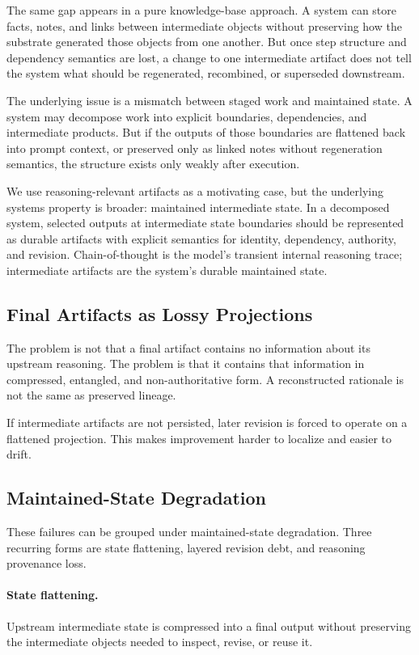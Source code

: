\documentclass{article}
\begin{document}
The same gap appears in a pure knowledge-base approach. A system can store facts, notes, and links between intermediate objects without preserving how the substrate generated those objects from one another. But once step structure and dependency semantics are lost, a change to one intermediate artifact does not tell the system what should be regenerated, recombined, or superseded downstream.

The underlying issue is a mismatch between staged work and maintained state. A system may decompose work into explicit boundaries, dependencies, and intermediate products. But if the outputs of those boundaries are flattened back into prompt context, or preserved only as linked notes without regeneration semantics, the structure exists only weakly after execution.

We use reasoning-relevant artifacts as a motivating case, but the underlying systems property is broader: maintained intermediate state. In a decomposed system, selected outputs at intermediate state boundaries should be represented as durable artifacts with explicit semantics for identity, dependency, authority, and revision. Chain-of-thought is the model's transient internal reasoning trace; intermediate artifacts are the system's durable maintained state.

\subsection{Final Artifacts as Lossy Projections}

The problem is not that a final artifact contains no information about its upstream reasoning. The problem is that it contains that information in compressed, entangled, and non-authoritative form. A reconstructed rationale is not the same as preserved lineage.

If intermediate artifacts are not persisted, later revision is forced to operate on a flattened projection. This makes improvement harder to localize and easier to drift.

\subsection{Maintained-State Degradation}

These failures can be grouped under maintained-state degradation. Three recurring forms are state flattening, layered revision debt, and reasoning provenance loss.

\paragraph{State flattening.} Upstream intermediate state is compressed into a final output without preserving the intermediate objects needed to inspect, revise, or reuse it.
\end{document}
